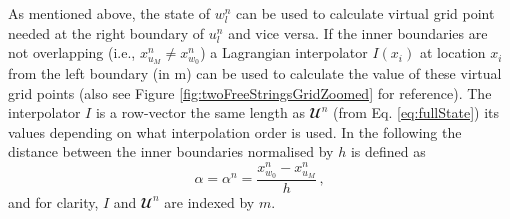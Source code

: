 As mentioned above, the state of $w_l^n$ can be used to calculate virtual grid point needed at the right boundary of $u_l^n$ and vice versa. If the inner boundaries are not overlapping (i.e., $x^n_{u_M} \neq x^n_{w_0}$) a Lagrangian interpolator $I(x_i)$ at location $x_i$ from the left boundary (in m) can be used to calculate the value of these virtual grid points (also see Figure \ref{fig:twoFreeStringsGridZoomed} for reference). The interpolator $I$ is a row-vector the same length as $\mathbfcal{U}^n$ (from Eq. \eqref{eq:fullState}) its values depending on what interpolation order is used. In the following the distance between the inner boundaries normalised by $h$ is defined as 
\begin{equation}\label{eq:alphaDef}
    \alpha = \alpha^n = \frac{x^n_{w_0} - x^n_{u_M}}{h}\,,
\end{equation}
and for clarity, $I$ and $\mathbfcal{U}^n$ are indexed by $m$.
